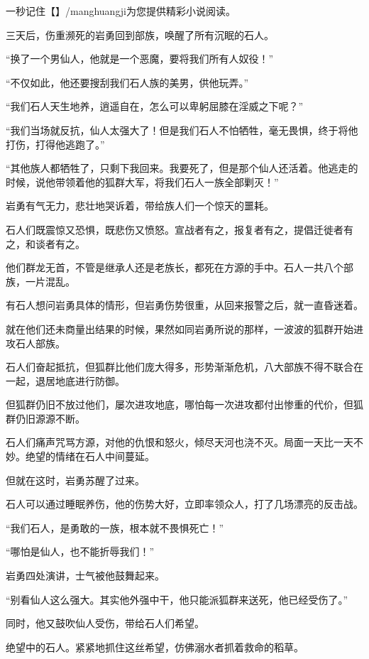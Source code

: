 
\begin{this_body}

一秒记住【】/manghuangji为您提供精彩小说阅读。

三天后，伤重濒死的岩勇回到部族，唤醒了所有沉眠的石人。

“换了一个男仙人，他就是一个恶魔，要将我们所有人奴役！”

“不仅如此，他还要搜刮我们石人族的美男，供他玩弄。”

“我们石人天生地养，逍遥自在，怎么可以卑躬屈膝在淫威之下呢？”

“我们当场就反抗，仙人太强大了！但是我们石人不怕牺牲，毫无畏惧，终于将他打伤，打得他逃跑了。”

“其他族人都牺牲了，只剩下我回来。我要死了，但是那个仙人还活着。他逃走的时候，说他带领着他的狐群大军，将我们石人一族全部剿灭！”

岩勇有气无力，悲壮地哭诉着，带给族人们一个惊天的噩耗。

石人们既震惊又恐惧，既悲伤又愤怒。宣战者有之，报复者有之，提倡迁徙者有之，和谈者有之。

他们群龙无首，不管是继承人还是老族长，都死在方源的手中。石人一共八个部族，一片混乱。

有石人想问岩勇具体的情形，但岩勇伤势很重，从回来报警之后，就一直昏迷着。

就在他们还未商量出结果的时候，果然如同岩勇所说的那样，一波波的狐群开始进攻石人部族。

石人们奋起抵抗，但狐群比他们庞大得多，形势渐渐危机，八大部族不得不联合在一起，退居地底进行防御。

但狐群仍旧不放过他们，屡次进攻地底，哪怕每一次进攻都付出惨重的代价，但狐群仍旧源源不断。

石人们痛声咒骂方源，对他的仇恨和怒火，倾尽天河也浇不灭。局面一天比一天不妙。绝望的情绪在石人中间蔓延。

但就在这时，岩勇苏醒了过来。

石人可以通过睡眠养伤，他的伤势大好，立即率领众人，打了几场漂亮的反击战。

“我们石人，是勇敢的一族，根本就不畏惧死亡！”

“哪怕是仙人，也不能折辱我们！”

岩勇四处演讲，士气被他鼓舞起来。

“别看仙人这么强大。其实他外强中干，他只能派狐群来送死，他已经受伤了。”

同时，他又鼓吹仙人受伤，带给石人们希望。

绝望中的石人。紧紧地抓住这丝希望，仿佛溺水者抓着救命的稻草。


\end{this_body}
